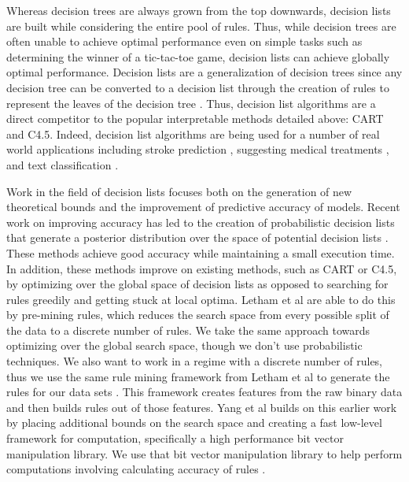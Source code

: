 Whereas decision trees are always grown from the top downwards, decision lists are built while considering the entire pool of rules.
Thus, while decision trees are often unable to achieve optimal performance even on simple tasks such as determining the winner of a tic-tac-toe game, decision lists can achieve globally optimal performance.
Decision lists are a generalization of decision trees since any decision tree can be converted to a decision list through the creation of rules to represent the leaves of the decision tree \cite{Rivest87}.
Thus, decision list algorithms are a direct competitor to the popular interpretable methods detailed above: CART and C4.5.
Indeed, decision list algorithms are being used for a number of real world applications including stroke prediction \cite{LethamRuMcMa15}, suggesting medical treatments \cite{ZhangLaTsDa2015}, and text classification \cite{LiYa02}.

Work in the field of decision lists focuses both on the generation of new theoretical bounds and the improvement of predictive accuracy of models.
Recent work on improving accuracy has led to the creation of probabilistic decision lists that generate a posterior distribution over the space of potential decision lists \cite{LethamRuMcMa15,YangRuSe16}.
These methods achieve good accuracy while maintaining a small execution time.
In addition, these methods improve on existing methods, such as CART or C4.5, by optimizing over the global space of decision lists as opposed to searching for rules greedily and getting stuck at local optima.
Letham et al are able to do this by pre-mining rules, which reduces the search space from every possible split of the data to a discrete number of rules.
We take the same approach towards optimizing over the global search space, though we don’t use probabilistic techniques.
We also want to work in a regime with a discrete number of rules, thus we use the same rule mining framework from Letham et al to generate the rules for our data sets \cite{LethamRuMcMa15}.
This framework creates features from the raw binary data and then builds rules out of those features.
Yang et al builds on this earlier work by placing additional bounds on the search space and creating a fast low-level framework for computation, specifically a high performance bit vector manipulation library.
We use that bit vector manipulation library to help perform computations involving calculating accuracy of rules \cite{YangRuSe16}.

